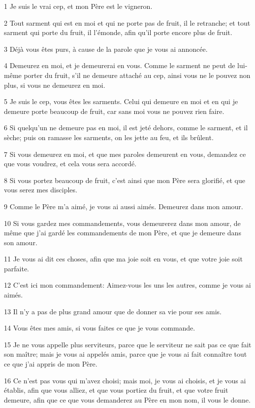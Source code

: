\par 1 Je suis le vrai cep, et mon Père est le vigneron.
\par 2 Tout sarment qui est en moi et qui ne porte pas de fruit, il le retranche; et tout sarment qui porte du fruit, il l'émonde, afin qu'il porte encore plus de fruit.
\par 3 Déjà vous êtes purs, à cause de la parole que je vous ai annoncée.
\par 4 Demeurez en moi, et je demeurerai en vous. Comme le sarment ne peut de lui-même porter du fruit, s'il ne demeure attaché au cep, ainsi vous ne le pouvez non plus, si vous ne demeurez en moi.
\par 5 Je suis le cep, vous êtes les sarments. Celui qui demeure en moi et en qui je demeure porte beaucoup de fruit, car sans moi vous ne pouvez rien faire.
\par 6 Si quelqu'un ne demeure pas en moi, il est jeté dehors, comme le sarment, et il sèche; puis on ramasse les sarments, on les jette au feu, et ils brûlent.
\par 7 Si vous demeurez en moi, et que mes paroles demeurent en vous, demandez ce que vous voudrez, et cela vous sera accordé.
\par 8 Si vous portez beaucoup de fruit, c'est ainsi que mon Père sera glorifié, et que vous serez mes disciples.
\par 9 Comme le Père m'a aimé, je vous ai aussi aimés. Demeurez dans mon amour.
\par 10 Si vous gardez mes commandements, vous demeurerez dans mon amour, de même que j'ai gardé les commandements de mon Père, et que je demeure dans son amour.
\par 11 Je vous ai dit ces choses, afin que ma joie soit en vous, et que votre joie soit parfaite.
\par 12 C'est ici mon commandement: Aimez-vous les uns les autres, comme je vous ai aimés.
\par 13 Il n'y a pas de plus grand amour que de donner sa vie pour ses amis.
\par 14 Vous êtes mes amis, si vous faites ce que je vous commande.
\par 15 Je ne vous appelle plus serviteurs, parce que le serviteur ne sait pas ce que fait son maître; mais je vous ai appelés amis, parce que je vous ai fait connaître tout ce que j'ai appris de mon Père.
\par 16 Ce n'est pas vous qui m'avez choisi; mais moi, je vous ai choisis, et je vous ai établis, afin que vous alliez, et que vous portiez du fruit, et que votre fruit demeure, afin que ce que vous demanderez au Père en mon nom, il vous le donne.
